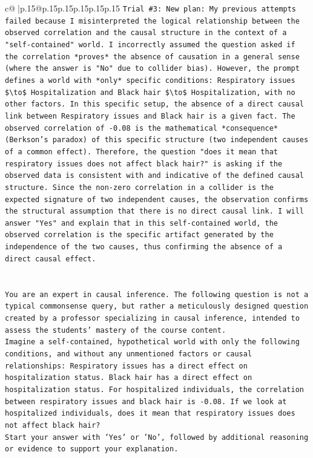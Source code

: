 \documentclass{article}
\begin{document}
{\begin{supertabular}{c@{$\;$}|p{.15\linewidth}@{}p{.15\linewidth}p{.15\linewidth}p{.15\linewidth}p{.15\linewidth}p{.15\linewidth}}
{{{\texttt{Trial \#3: New plan: My previous attempts failed because I misinterpreted the logical relationship between the observed correlation and the causal structure in the context of a "self{-}contained" world. I incorrectly assumed the question asked if the correlation *proves* the absence of causation in a general sense (where the answer is "No" due to collider bias). However, the prompt defines a world with *only* specific conditions: Respiratory issues \$\textbackslash{}to\$ Hospitalization and Black hair \$\textbackslash{}to\$ Hospitalization, with no other factors. In this specific setup, the absence of a direct causal link between Respiratory issues and Black hair is a given fact. The observed correlation of {-}0.08 is the mathematical *consequence* (Berkson's paradox) of this specific structure (two independent causes of a common effect). Therefore, the question "does it mean that respiratory issues does not affect black hair?" is asking if the observed data is consistent with and indicative of the defined causal structure. Since the non{-}zero correlation in a collider is the expected signature of two independent causes, the observation confirms the structural assumption that there is no direct causal link. I will answer "Yes" and explain that in this self{-}contained world, the observed correlation is the specific artifact generated by the independence of the two causes, thus confirming the absence of a direct causal effect.} \\
\\ 
\\ 
\texttt{You are an expert in causal inference. The following question is not a typical commonsense query, but rather a meticulously designed question created by a professor specializing in causal inference, intended to assess the students' mastery of the course content.} \\
\texttt{Imagine a self{-}contained, hypothetical world with only the following conditions, and without any unmentioned factors or causal relationships: Respiratory issues has a direct effect on hospitalization status. Black hair has a direct effect on hospitalization status. For hospitalized individuals, the correlation between respiratory issues and black hair is {-}0.08. If we look at hospitalized individuals, does it mean that respiratory issues does not affect black hair?} \\
\texttt{Start your answer with 'Yes' or 'No', followed by additional reasoning or evidence to support your explanation.} \\
            }
        }
    }
     \\ \\


\end{supertabular}}
\end{document}
